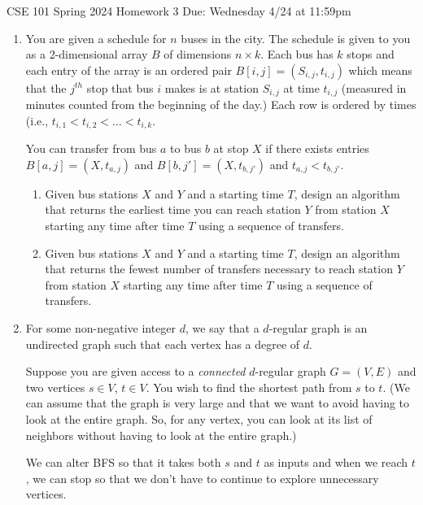 \documentclass[10pt,letterpaper,unboxed,cm]{article}
\begin{document}
\hfill{CSE 101 Spring 2024}
\hfill{Homework 3}
\hfill{Due: Wednesday 4/24 at 11:59pm}

\begin{enumerate}



\item
You are given a schedule for $n$ buses in the city. The schedule is given to you as a 2-dimensional array $B$ of dimensions $n\times k$. Each bus has $k$ stops and each entry of the array is an ordered pair $B[i,j] = (S_{i,j},t_{i,j})$  which means that the $j^{th}$ stop that bus $i$ makes is at station $S_{i,j}$ at time $t_{i,j}$ (measured in minutes counted from the beginning of the day.) Each row is ordered by times (i.e., $t_{i,1}<t_{i,2}<\dots <t_{i,k}$. 

You can transfer from bus $a$ to bus $b$ at stop $X$ if there exists entries $B[a,j] = (X,t_{a,j})$ and $B[b,j'] = (X,t_{b,j'})$ and $t_{a,j} < t_{b,j'}$.

\begin{enumerate}
\item
Given bus stations $X$ and $Y$ and a starting time $T$, design an algorithm that returns the earliest time you can reach station $Y$ from station $X$ starting any time after time $T$ using a sequence of transfers.
\item
Given bus stations $X$ and $Y$ and a starting time $T$, design an algorithm that returns the fewest number of transfers necessary to reach station $Y$ from station $X$ starting any time after time $T$ using a sequence of transfers.
\end{enumerate}





\item
For some non-negative integer $d$, we say that a $d$-regular graph is an undirected graph such that each vertex has a degree of $d$.

Suppose you are given access to a \emph{connected} $d$-regular graph $G=(V,E)$ and two vertices $s\in V$, $t\in V$. You wish to find the shortest path from $s$ to $t$. (We can assume that the graph is very large and that we want to avoid having to look at the entire graph. So, for any vertex, you can look at its list of neighbors without having to look at the entire graph.)


We can alter BFS so that it takes both $s$ and $t$ as inputs and when we reach $t$, we can stop so that we don't have to continue to explore unnecessary vertices.



\end{enumerate}
\end{document}
